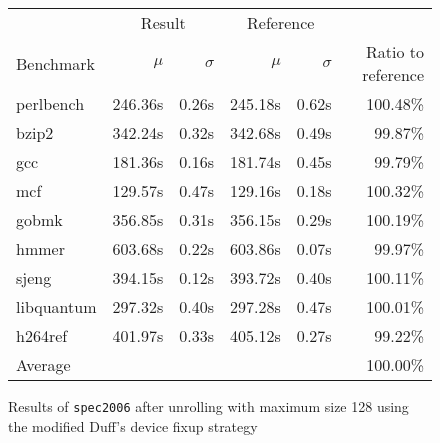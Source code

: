 \begin{figure}[th]
    \begin{center}
        \begin{tabular}{lrrrrr}
            \toprule
            & \multicolumn{2}{c}{Result} & \multicolumn{2}{c}{Reference}\\
            Benchmark & $\mu$ & $\sigma$ & $\mu$ & $\sigma$ & Ratio to reference\\
            \midrule
            perlbench & 246.36s & 0.26s & 245.18s & 0.62s & 100.48\%\\
            bzip2 & 342.24s & 0.32s & 342.68s & 0.49s & 99.87\%\\
            gcc & 181.36s & 0.16s & 181.74s & 0.45s & 99.79\%\\
            mcf & 129.57s & 0.47s & 129.16s & 0.18s & 100.32\%\\
            gobmk & 356.85s & 0.31s & 356.15s & 0.29s & 100.19\%\\
            hmmer & 603.68s & 0.22s & 603.86s & 0.07s & 99.97\%\\
            sjeng & 394.15s & 0.12s & 393.72s & 0.40s & 100.11\%\\
            libquantum & 297.32s & 0.40s & 297.28s & 0.47s & 100.01\%\\
            h264ref & 401.97s & 0.33s & 405.12s & 0.27s & 99.22\%\\
            \midrule
            Average & & & & & 100.00\%\\
            \bottomrule
        \end{tabular}
    \end{center}
    \caption{Results of \texttt{spec2006} after unrolling with maximum size 128 using the modified Duff's device fixup strategy}
    \label{fig:eval:perf:duff:128}
\end{figure}
